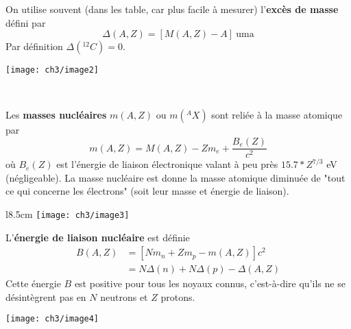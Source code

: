On utilise souvent (dans les table, car plus facile à mesurer) l'\textbf{excès de masse} défini par
\begin{equation}
\Delta (A,Z) = [M(A,Z) - A]\ \text{uma}
\end{equation}
Par définition $\Delta(^{12}C)=0$.

\begin{center}
	\texttt{[image: ch3/image2]}
\end{center}\ 

Les \textbf{masses nucléaires} $m(A,Z)$ ou $m(^AX)$ sont reliée à la masse atomique par
\begin{equation}
m(A,Z) = M(A,Z) - Zm_e + \dfrac{B_e(Z)}{c^2}
\end{equation}
où $B_e(Z)$ est l'énergie de liaison électronique valant à peu près $15.7*Z^{7/3}$ eV (négligeable). La masse
nucléaire est donne la masse atomique diminuée de "tout ce qui concerne les électrons" (soit leur masse et 
énergie de liaison).\\

	\begin{wrapfigure}[8]{l}{8.5cm}
	\vspace{-5mm}
	\texttt{[image: ch3/image3]}
	\end{wrapfigure}


L'\textbf{énergie de liaison nucléaire} est définie
\begin{equation}
\begin{array}{ll}
B(A,Z) &= [Nm_n + Zm_p-m(A,Z)]c^2 \\ 
&= N\Delta (n) + N\Delta(p) - \Delta(A,Z)\end{array}
\end{equation}
Cette énergie $B$ est positive pour tous les noyaux connus, c'est-à-dire qu'ils ne se désintègrent pas en 
$N$ neutrons et $Z$ protons.\\


\begin{center}
\texttt{[image: ch3/image4]}
\end{center}

